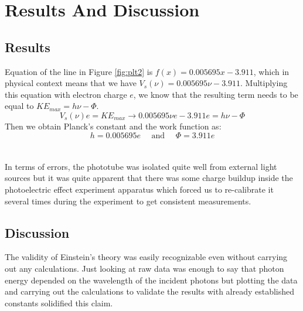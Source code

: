 \section{Results And Discussion}

	\subsection{Results}
	Equation of the line in Figure \ref{fig:plt2} is $f(x) = 0.005695 x - 3.911$, which in physical context means that we have $V_s(\nu) = 0.005695 \nu - 3.911$. Multiplying this equation with electron charge $e$, we know that the resulting term needs to be equal to $KE_{max} = h \nu - \Phi$. 
	\begin{equation}
		V_s(\nu) e = KE_{max} \rightarrow 0.005695 \nu e - 3.911 e = h \nu - \Phi
	\end{equation}
	Then we obtain Planck's constant and the work function as:
	\begin{equation}
		h = 0.005695e \quad \text{ and } \quad \Phi = 3.911e
	\end{equation}
	\\
	\\
	In terms of errors, the phototube was isolated quite well from external light sources but it was quite apparent that there was some charge buildup inside the photoelectric effect experiment apparatus which forced us to re-calibrate it several times during the experiment to get consistent measurements.
	
	\subsection{Discussion}
	The validity of Einstein's theory was easily recognizable even without carrying out any calculations. Just looking at raw data was enough to say that photon energy depended on the wavelength of the incident photons but plotting the data and carrying out the calculations to validate the results with already established constants solidified this claim.